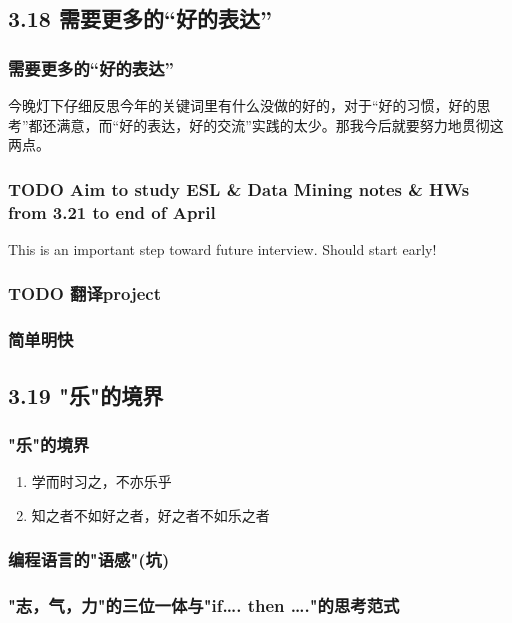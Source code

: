 \documentclass[11pt]{article}
\begin{document}
\subsection*{3.18 需要更多的“好的表达”}
\label{sec:orgheadline164}
\subsubsection*{需要更多的“好的表达”}
\label{sec:orgheadline160}
今晚灯下仔细反思今年的关键词里有什么没做的好的，对于“好的习惯，好的思考”都还满意，而“好的表达，好的交流”实践的太少。那我今后就要努力地贯彻这两点。
\subsubsection*{{\bfseries\sffamily TODO} Aim to study ESL \& Data Mining notes \& HWs from 3.21 to end of April}
\label{sec:orgheadline161}
This is an important step toward future interview. Should start early!
\subsubsection*{{\bfseries\sffamily TODO} 翻译project}
\label{sec:orgheadline162}
\subsubsection*{简单明快}
\label{sec:orgheadline163}
\subsection*{3.19 "乐"的境界}
\label{sec:orgheadline169}
\subsubsection*{"乐"的境界}
\label{sec:orgheadline165}
\begin{enumerate}
\item 学而时习之，不亦乐乎
\item 知之者不如好之者，好之者不如乐之者
\end{enumerate}
\subsubsection*{编程语言的"语感"(坑)}
\label{sec:orgheadline166}
\subsubsection*{"志，气，力"的三位一体与"if\ldots{}. then \ldots{}."的思考范式}
\label{sec:orgheadline167}
\end{document}
